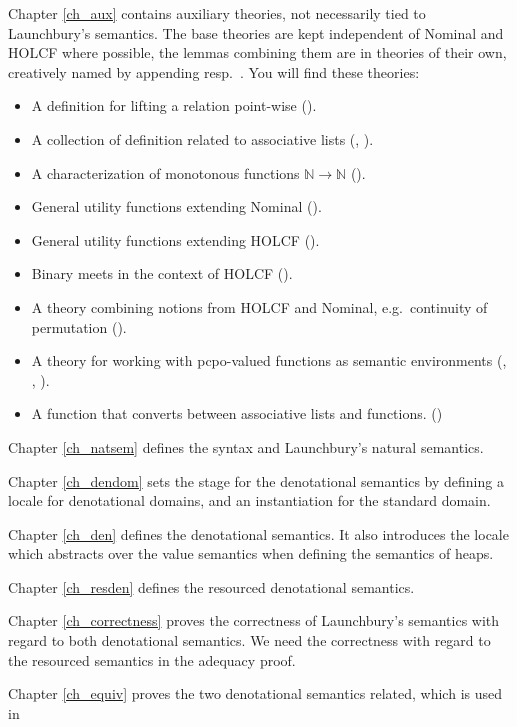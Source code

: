 \documentclass[11pt,a4paper,parskip=half]{scrartcl}
\begin{document}
Chapter \ref{ch_aux} contains auxiliary theories, not necessarily tied to Launchbury's semantics. The base theories are kept independent of Nominal and HOLCF where possible, the lemmas combining them are in theories of their own, creatively named by appending  resp.\ .  You will find these theories:
\begin{itemize}
\item A definition for lifting a relation point-wise ().
\item A collection of definition related to associative lists (, ).
\item A characterization of monotonous functions $\mathbb N \to \mathbb N$ ().
\item General utility functions extending Nominal ().
\item General utility functions extending HOLCF ().
\item Binary meets in the context of HOLCF ().
\item A theory combining notions from HOLCF and Nominal, e.g.\ continuity of permutation ().
\item A theory for working with pcpo-valued functions as semantic environments (, , ).
\item A function  that converts between associative lists and functions. ()
\end{itemize}

Chapter \ref{ch_natsem} defines the syntax and Launchbury's natural semantics.

Chapter \ref{ch_dendom} sets the stage for the denotational semantics by defining a locale  for denotational domains, and an instantiation for the standard domain.

Chapter \ref{ch_den} defines the denotational semantics. It also introduces the locale  which abstracts over the value semantics when defining the semantics of heaps.

Chapter \ref{ch_resden} defines the resourced denotational semantics.

Chapter \ref{ch_correctness} proves the correctness of Launchbury's semantics with regard to both denotational semantics. We need the correctness with regard to the resourced semantics in the adequacy proof.

Chapter \ref{ch_equiv} proves the two denotational semantics related, which is used in
\end{document}
